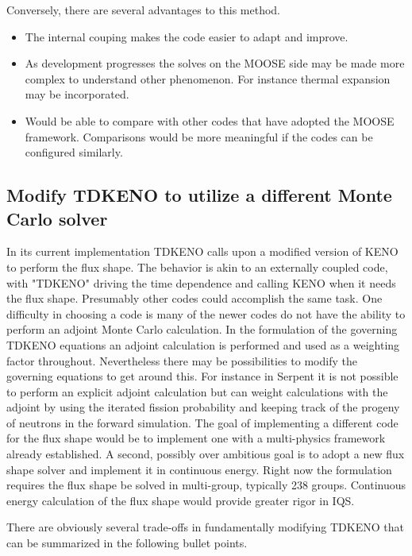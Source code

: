 \documentclass[11pt]{article}
\begin{document}
Conversely, there are several advantages to this method.
\begin{itemize}
    \item The internal couping makes the code easier to adapt and improve. 
    \item As development progresses the solves on the MOOSE side may be made more complex to understand other phenomenon. For instance thermal expansion may be incorporated.  
    \item Would be able to compare with other codes that have adopted the MOOSE framework.  Comparisons would be more meaningful if the codes can be configured similarly. 
\end{itemize}

\subsection{Modify TDKENO to utilize a different Monte Carlo solver}
	In its current implementation TDKENO  calls upon a modified version of KENO to perform the flux shape.  The behavior is akin to an externally coupled code, with "TDKENO" driving the time dependence and calling KENO when it needs the flux shape. Presumably other codes could accomplish the same task.  One difficulty in choosing a code is many of the newer codes do not have the ability to perform an adjoint Monte Carlo calculation. In the  formulation of the governing TDKENO equations an adjoint calculation is performed and used as a weighting factor throughout.  Nevertheless there may be possibilities to modify the governing equations to get around this. For instance in Serpent it is not possible to perform an explicit adjoint calculation but can weight calculations with the adjoint by using the iterated fission probability and keeping track of the progeny of neutrons in the forward simulation.  The goal of implementing a different code for the flux shape would be to implement one with a multi-physics framework already established.  A second, possibly over ambitious goal is to adopt a new flux shape solver and implement it in continuous energy.  Right now the formulation requires the flux shape be solved in multi-group, typically 238 groups.  Continuous energy calculation of the flux shape would provide greater rigor in IQS.  
	
	There are obviously several trade-offs in fundamentally modifying TDKENO that can be summarized in the following bullet points.
	
\end{document}
